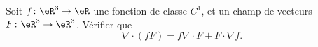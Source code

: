 
\begin{exercice}\label{exoOutilsMath-0066}

    Soit $f\colon \eR^3\to \eR$ une fonction de classe $C^1$, et un champ de vecteurs $F\colon \eR^3\to \eR^3$. Vérifier que
    \begin{equation}
        \nabla\cdot(f F)=f\nabla\cdot F+F\cdot \nabla f.
    \end{equation}

\end{exercice}

